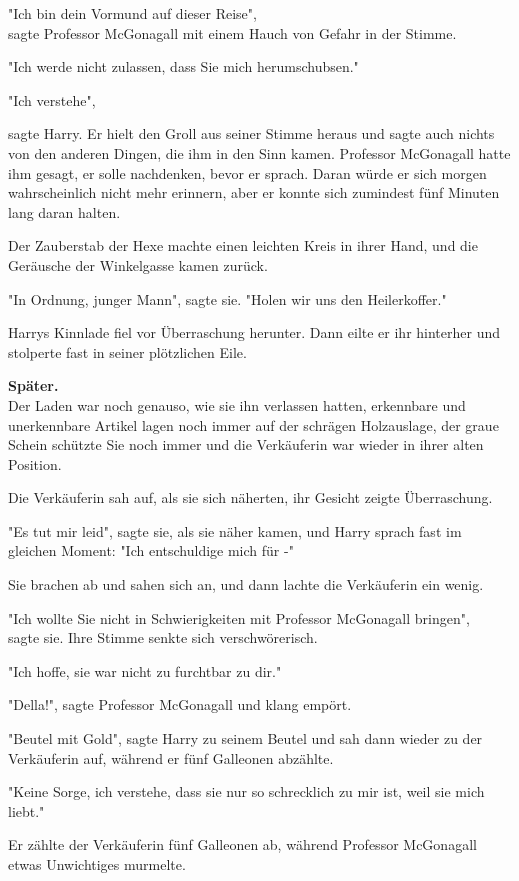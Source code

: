{"Ich bin dein Vormund auf dieser Reise",\\ sagte Professor McGonagall mit einem Hauch von Gefahr in der Stimme.

"Ich werde nicht zulassen, dass Sie mich herumschubsen."

"Ich verstehe",

sagte Harry. Er hielt den Groll aus seiner Stimme heraus und sagte auch nichts von den anderen Dingen, die ihm in den Sinn kamen. Professor McGonagall hatte ihm gesagt, er solle nachdenken, bevor er sprach. Daran würde er sich morgen wahrscheinlich nicht mehr erinnern, aber er konnte sich zumindest fünf Minuten lang daran halten.

Der Zauberstab der Hexe machte einen leichten Kreis in ihrer Hand, und die Geräusche der Winkelgasse kamen zurück.

"In Ordnung, junger Mann", sagte sie. "Holen wir uns den Heilerkoffer."

Harrys Kinnlade fiel vor Überraschung herunter. Dann eilte er ihr hinterher und stolperte fast in seiner plötzlichen Eile.

\textbf{Später.}\\ Der Laden war noch genauso, wie sie ihn verlassen hatten, erkennbare und unerkennbare Artikel lagen noch immer auf der schrägen Holzauslage, der graue Schein schützte Sie noch immer und die Verkäuferin war wieder in ihrer alten Position.

Die Verkäuferin sah auf, als sie sich näherten, ihr Gesicht zeigte Überraschung.

"Es tut mir leid", sagte sie, als sie näher kamen, und Harry sprach fast im gleichen Moment: "Ich entschuldige mich für -"

Sie brachen ab und sahen sich an, und dann lachte die Verkäuferin ein wenig.

"Ich wollte Sie nicht in Schwierigkeiten mit Professor McGonagall bringen",\\ sagte sie. Ihre Stimme senkte sich verschwörerisch.

"Ich hoffe, sie war nicht zu furchtbar zu dir."

"Della!", sagte Professor McGonagall und klang empört.

"Beutel mit Gold", sagte Harry zu seinem Beutel und sah dann wieder zu der Verkäuferin auf, während er fünf Galleonen abzählte.

"Keine Sorge, ich verstehe, dass sie nur so schrecklich zu mir ist, weil sie mich liebt."

Er zählte der Verkäuferin fünf Galleonen ab, während Professor McGonagall etwas Unwichtiges murmelte.

}
